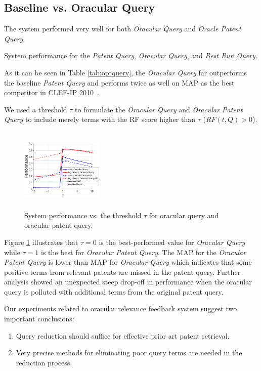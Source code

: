 \subsection{Baseline vs. Oracular Query}
The system performed very well for both {\em Oracular Query} and {\em Oracle Patent Query}.  
\begin{table}[htpb]
  \begin{center}
   \caption{System performance for the {\em Patent Query}, {\em Oracular Query}, and {\em Best Run Query}.}
   \vspace*{1ex}
     
  \label{tab:optquery}
  \end{center}  
\end{table}
As it can be seen in Table \ref{tab:optquery}, the {\em Oracular Query} far outperforms the baseline {\em Patent Query} and performs twice as well on MAP as the best competitor in CLEF-IP 2010~\cite{lopez2010experiments}.

We used a threshold $\tau$ to formulate the {\em Oracular Query} and {\em Oracular Patent Query} to include merely terms with the RF score higher than $\tau$ ($RF(t,Q)>0$). 
\begin{figure}[htpb]
   \centering
   \includegraphics[width=0.35\textwidth,height=40mm]{figs/oracularquery2.eps}
   \caption{System performance vs. the threshold $\tau$ for oracular query and oracular patent query.}   
   \label{fig:oracular} 
\end{figure} 
Figure \ref{fig:oracular} illustrates that $\tau=0$ is the best-performed value for {\em Oracular Query} while $\tau=1$ is the best for {\em Oracular Patent Query}. The MAP for the {\em Oracular Patent Query} is lower than MAP for {\em Oracular Query} which indicates that some positive terms from relevant patents are missed in the patent query. Further analysis showed an unexpected steep drop-off in performance when the oracular query is polluted with additional terms from the original patent query. 

Our experiments related to oracular relevance feedback system suggest two important conclusions:
\begin{enumerate}
  \item Query reduction should suffice for effective prior art patent retrieval.
  \item Very precise methods for eliminating poor query terms are needed in the reduction process.
\end{enumerate}